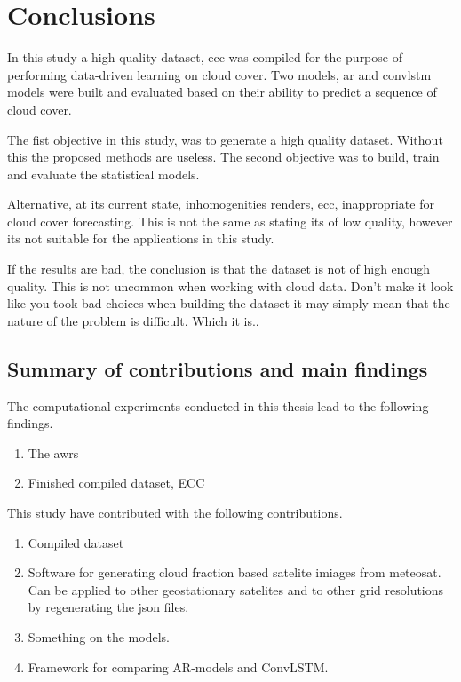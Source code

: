 \chapter{Conclusions}
In this study a high quality dataset, \acrfull{ecc} was compiled for the purpose of performing data-driven learning on cloud cover. Two models, \acrfull{ar} and \acrlong{convlstm} models were built and evaluated based on their ability to predict a sequence of cloud cover.

The fist objective in this study, was to generate a high quality dataset. Without this the proposed methods are useless. The second objective was to build, train and evaluate the statistical models. 

Alternative, at its current state, inhomogenities renders, \acrshort{ecc}, inappropriate for cloud cover forecasting. This is not the same as stating its of low quality, however its not suitable for the applications in this study. 

If the results are bad, the conclusion is that the dataset is not of high enough quality. This is not uncommon when working with cloud data. Don't make it look like you took bad choices when building the dataset it may simply mean that the nature of the problem is difficult. Which it is..



\section{Summary of contributions and main findings }
The computational experiments conducted in this thesis lead to the following findings. 
\begin{enumerate}
    \item The \acrfull{awrs}
    \item Finished compiled dataset, ECC
\end{enumerate}

This study have contributed with the following contributions.
\begin{enumerate}
    \item Compiled dataset 
    \item Software for generating cloud fraction based satelite imiages from meteosat. Can be applied to other geostationary satelites and to other grid resolutions by regenerating the json files.
    \item Something on the models. 
    \item Framework for comparing AR-models and ConvLSTM.
\end{enumerate}

